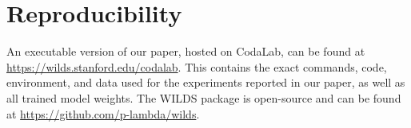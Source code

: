 \section*{Reproducibility}
An executable version of our paper, hosted on CodaLab, can be found at \url{https://wilds.stanford.edu/codalab}. This contains the exact commands, code, environment, and data used for the experiments reported in our paper, as well as all trained model weights. The WILDS package is open-source and can be found at \url{https://github.com/p-lambda/wilds}.
